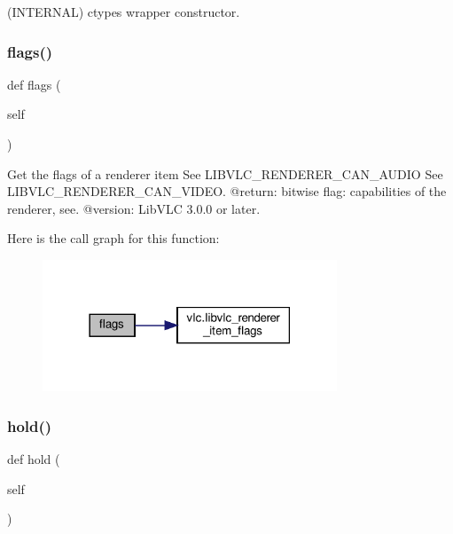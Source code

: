 \begin{DoxyVerb}(INTERNAL) ctypes wrapper constructor.
\end{DoxyVerb}
 \mbox{\label{classvlc_1_1_renderer_af775bd05363da54958bd28e5dbe4a2a9}} 
\subsubsection{\texorpdfstring{flags()}{flags()}}
{\footnotesize\ttfamily def flags (\begin{DoxyParamCaption}\item[{}]{self }\end{DoxyParamCaption})}

\begin{DoxyVerb}Get the flags of a renderer item
See LIBVLC_RENDERER_CAN_AUDIO
See LIBVLC_RENDERER_CAN_VIDEO.
@return: bitwise flag: capabilities of the renderer, see.
@version: LibVLC 3.0.0 or later.
\end{DoxyVerb}
 Here is the call graph for this function\+:
\nopagebreak
\begin{figure}[H]
\begin{center}
\leavevmode
\includegraphics[width=249pt]{classvlc_1_1_renderer_af775bd05363da54958bd28e5dbe4a2a9_cgraph}
\end{center}
\end{figure}
\mbox{\label{classvlc_1_1_renderer_a3d005406da2434646eee68e2f7175b35}} 
\subsubsection{\texorpdfstring{hold()}{hold()}}
{\footnotesize\ttfamily def hold (\begin{DoxyParamCaption}\item[{}]{self }\end{DoxyParamCaption})}

